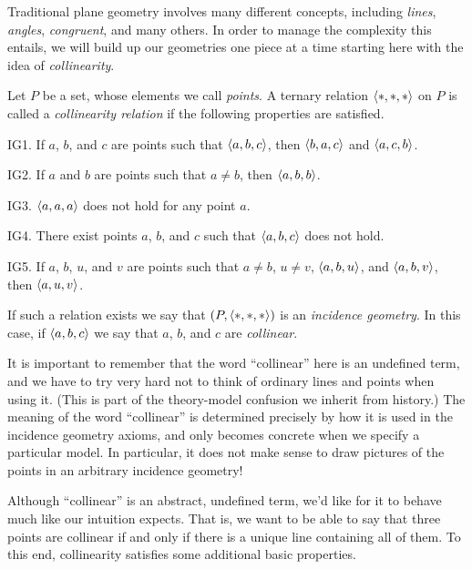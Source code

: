 Traditional plane geometry involves many different concepts, including \emph{lines}, \emph{angles}, \emph{congruent}, and many others. In order to manage the complexity this entails, we will build up our geometries one piece at a time starting here with the idea of \emph{collinearity}. 

\begin{dfn}
Let $P$ be a set, whose elements we call \emph{points}. A ternary relation $\langle \ast, \ast, \ast \rangle$ on $P$ is called a \emph{collinearity relation} if the following properties are satisfied.
\begin{proplist}
\item[IG1.] If $a$, $b$, and $c$ are points such that $\langle a, b, c \rangle$, then $\langle b, a, c \rangle$ and $\langle a, c, b \rangle$.
\item[IG2.] If $a$ and $b$ are points such that $a \neq b$, then $\langle a, b, b \rangle$.
\item[IG3.] $\langle a, a, a \rangle$ does not hold for any point $a$.
\item[IG4.] There exist points $a$, $b$, and $c$ such that $\langle a, b, c \rangle$ does not hold.
\item[IG5.] If $a$, $b$, $u$, and $v$ are points such that $a \neq b$, $u \neq v$, $\langle a, b, u \rangle$, and $\langle a, b, v \rangle$, then $\langle a, u, v \rangle$.
\end{proplist}
If such a relation exists we say that $(P, \langle \ast, \ast, \ast \rangle)$ is an \emph{incidence geometry}. In this case, if $\langle a, b, c \rangle$ we say that $a$, $b$, and $c$ are \emph{collinear}.
\end{dfn}

It is important to remember that the word ``collinear'' here is an undefined term, and we have to try very hard not to think of ordinary lines and points when using it. (This is part of the theory-model confusion we inherit from history.) The meaning of the word ``collinear'' is determined precisely by how it is used in the incidence geometry axioms, and only becomes concrete when we specify a particular model. In particular, it does not make sense to draw pictures of the points in an arbitrary incidence geometry!

Although ``collinear'' is an abstract, undefined term, we'd like for it to behave much like our intuition expects. That is, we want to be able to say that three points are collinear if and only if there is a unique line containing all of them. To this end, collinearity satisfies some additional basic properties.

